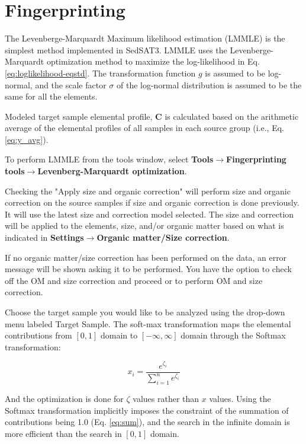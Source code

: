 \documentclass[12pt]{report}
\begin{document}
\section{Fingerprinting}
The Levenberge-Marquardt Maximum likelihood estimation (LMMLE) is the simplest method implemented in SedSAT3. LMMLE uses the Levenberge-Marquardt optimization method to maximize the log-likelihood in Eq. \eqref{eq:loglikelihood-eqstd}. The transformation function $g$ is assumed to be log-normal, and the scale factor $\sigma$ of the log-normal distribution is assumed to be the same for all the elements. 

Modeled target sample elemental profile, $\mathbf{C}$ is calculated based on the arithmetic average of the elemental profiles of all samples in each source group (i.e., Eq. \eqref{eq:y_avg}). 

To perform LMMLE from the tools window, select \textbf{Tools}$\rightarrow$\textbf{Fingerprinting tools}$\rightarrow$\textbf{Levenberg-Marquardt optimization}. 

Checking the "Apply size and organic correction" will perform size and organic correction on the source samples if size and organic correction is done previously. It will use the latest size and correction model selected. The size and correction will be applied to the elements, size, and/or organic matter based on what is indicated in \textbf{Settings}$\rightarrow$\textbf{Organic matter/Size correction}. 

If no organic matter/size correction has been performed on the data, an error message will be shown asking it to be performed. You have the option to check off the OM and size correction and proceed or to perform OM and size correction. 

Choose the target sample you would like to be analyzed using the drop-down menu labeled Target Sample. The soft-max transformation maps the elemental contributions from $[0,1]$ domain to $[-\infty, \infty]$ domain through the Softmax transformation: 

\begin{equation}
    x_i = \frac{e^{\zeta_i}}{\sum_{i=1}^n e^{\zeta_i}}
\end{equation}

And the optimization is done for $\zeta$ values rather than $x$ values. Using the Softmax transformation implicitly imposes the constraint of the summation of contributions being 1.0 (Eq. \eqref{eq:sum}), and the search in the infinite domain is more efficient than the search in $[0,1]$ domain. 
\end{document}
